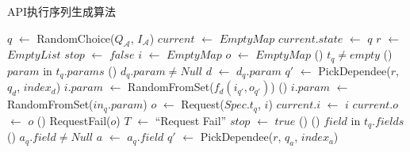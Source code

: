         \begin{algorithm}
          	\scriptsize
          	
            \caption{API执行序列生成算法}
          	
            $q$ $\gets$ RandomChoice($Q_{\mathcal{A}}$, $I_{\mathcal{A}}$)\;
            $current$ $\gets$ $EmptyMap$\;
            $current.state$ $\gets$ $q$\;
            $r$ $\gets$ $EmptyList$\;
            $stop$ $\gets$ $false$\;
             {
            	$i$ $\gets$ $EmptyMap$\;
                $o$ $\gets$ $EmptyMap$\;
            	\If() {$t_q \neq empty$}{
                	\ForEach() {$param$ in $t_q.params$} {
                    	\If() {$d_q.param \neq Null$} {
                        	$d$ $\gets$ $d_q.param$\;
                            $q'$ $\gets$ PickDependee($r$, $q_d$, $index_d$)\;
                            $i.param$ $\gets$ RandomFromSet($f_d(i_{q'}, o_{q'})$)\;
                        } \Else() {
                        	$i.param$ $\gets$ RandomFromSet($in_q.param$)\;
                        }
                    }
                    $o$ $\gets$ Request($Spec.t_q$, $i$)\;
                    $current.i$ $\gets$ $i$\;
                    $current.o$ $\gets$ $o$\;
                    \If() {RequestFail($o$)} {
                    	$T$ $\gets$ ``Request Fail''\;
                        $stop$ $\gets$ $true$\;
                    } \Else() {
                    	\ForEach() {$field$ in $t_q.fields$} {
                        	\If() {$a_q.field \neq Null$} {
                            	$a$ $\gets$ $a_q.field$\;
                                $q'$ $\gets$ PickDependee($r$, $q_a$, $index_a$)\;
}}}}}
\end{algorithm}

